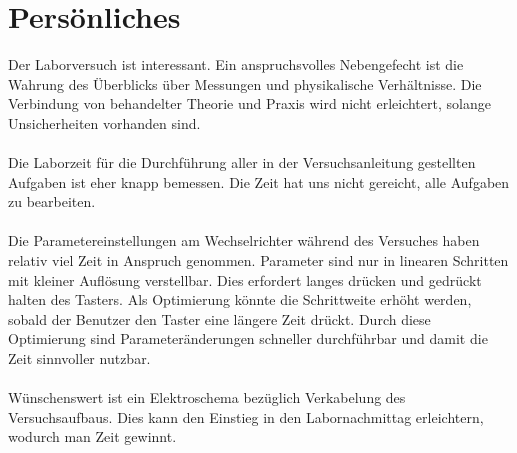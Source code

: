 \section{Persönliches}

Der Laborversuch ist interessant. Ein anspruchsvolles Nebengefecht ist die Wahrung des Überblicks über Messungen und physikalische Verhältnisse. Die Verbindung von behandelter Theorie und Praxis wird nicht erleichtert, solange Unsicherheiten vorhanden sind.\\
\\
Die Laborzeit für die Durchführung aller in der Versuchsanleitung gestellten Aufgaben ist eher knapp bemessen. Die Zeit hat uns nicht gereicht, alle Aufgaben zu bearbeiten.\\
\\
Die Parametereinstellungen am Wechselrichter während des Versuches haben relativ viel Zeit in Anspruch genommen. Parameter sind nur in linearen Schritten mit kleiner Auflösung verstellbar. Dies erfordert langes drücken und gedrückt halten des Tasters. Als Optimierung könnte die Schrittweite erhöht werden, sobald der Benutzer den Taster eine längere Zeit drückt. Durch diese Optimierung sind Parameteränderungen schneller durchführbar und damit die Zeit sinnvoller nutzbar.\\
\\
Wünschenswert ist ein Elektroschema bezüglich Verkabelung des Versuchsaufbaus. Dies kann den Einstieg in den Labornachmittag erleichtern, wodurch man Zeit gewinnt.

\newpage
